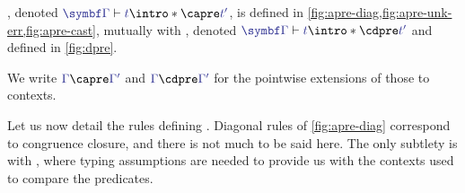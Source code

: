 \begin{figure*}[ht]
	\caption{ in , diagonal rules}
	\label{fig:apre-diag}
\end{figure*}

\begin{minipage}{\textwidth}
\begin{definition}

  , denoted $\tcol{\GG} \vdash \tcol{t}
  \intro*\capre \tcol{t'}$, is defined in \cref{fig:apre-diag,fig:apre-unk-err,fig:apre-cast},
  mutually with ,
  denoted $\tcol{\GG} \vdash \tcol{t} \intro*\cdpre \tcol{t'}$
  and defined in \cref{fig:dpre}.

  We write $\tcol{\Gamma} \capre \tcol{\Gamma'}$ and $\tcol{\Gamma} \cdpre \tcol{\Gamma'}$ for the pointwise extensions of those to contexts.

\end{definition}
\end{minipage}

Let us now detail the rules defining .
Diagonal rules of \cref{fig:apre-diag} correspond to congruence closure, and there is
not much to be said here. The only subtlety is with ,
where typing assumptions are needed to provide us with the contexts
used to compare the predicates.

\begin{figure*}[ht]
  \ContinuedFloat
  \caption{ in ,  and }
  \label{fig:apre-unk-err}
\end{figure*}

